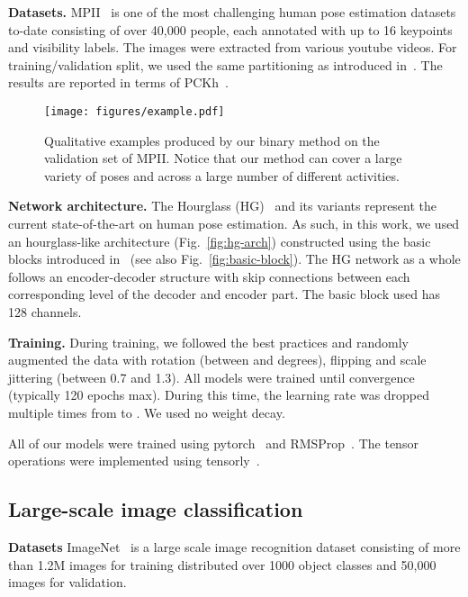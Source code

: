 \documentclass[10pt,twocolumn,letterpaper]{article}
\begin{document}
\textbf{Datasets.} MPII~\cite{andriluka20142d} is one of the most challenging human pose estimation datasets to-date consisting of over 40,000 people, each annotated with up to 16 keypoints and visibility labels. The images were extracted from various youtube videos. For training/validation split, we used the same partitioning as introduced in~\cite{tompson2014joint}. The results are reported in terms of PCKh~\cite{andriluka20142d}.


\begin{figure*}
    \centering
    \texttt{[image: figures/example.pdf]}
    \caption{Qualitative examples produced by our binary method on the validation set of MPII. Notice that our method can cover a large variety of poses and across a large number of different activities.}
    \label{fig:examples}
\end{figure*}


\textbf{Network architecture.} The Hourglass (HG)~\cite{newell2016stacked} and its variants represent the current state-of-the-art on human pose estimation. As such, in this work, we used an hourglass-like architecture (Fig.~\ref{fig:hg-arch}) constructed using the basic blocks introduced in~\cite{he2016deep, rastegari2016xnor} (see also Fig.~\ref{fig:basic-block}). The HG network as a whole follows an encoder-decoder structure with skip connections between each corresponding level of the decoder and encoder part. The basic block used has 128 channels.

\noindent\textbf{Training.} During training, we followed the best practices and randomly augmented  the  data  with  rotation  (between   and  degrees), flipping and scale jittering (between 0.7 and 1.3). All models were trained until convergence (typically 120 epochs max). During this time, the learning rate was dropped multiple times from   to . We used no weight decay.

All of our models were trained using pytorch~\cite{paszke2017automatic} and RMSProp~\cite{tieleman2012lecture}. The tensor operations were implemented using tensorly~\cite{kossaifi2016tensorly}.

\subsection{Large-scale image classification}

\textbf{Datasets} ImageNet~\cite{deng2009imagenet} is a large scale image recognition dataset consisting of more than 1.2M images for training distributed over 1000 object classes and 50,000 images for validation.
\end{document}
